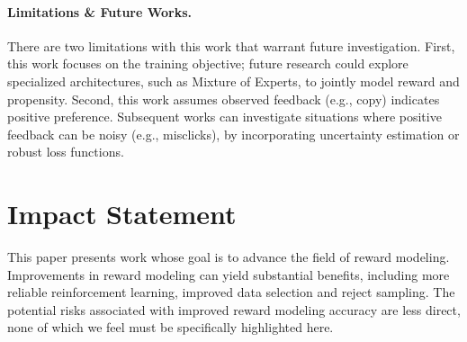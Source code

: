 \documentclass[]{arxiv_singlecolumn}
\theoremstyle{plain}
\newtheorem{theorem}{Theorem}[section]
\theoremstyle{definition}
\theoremstyle{remark}
\begin{document}
\paragraph{Limitations \& Future Works.} 
There are two limitations with this work that warrant future investigation. First, this work focuses on the training objective; future research could explore specialized architectures, such as Mixture of Experts, to jointly model reward and propensity. 
Second, this work assumes observed feedback (e.g., copy) indicates positive preference. Subsequent works can investigate situations where positive feedback can be noisy (e.g., misclicks), by incorporating uncertainty estimation or robust loss functions.

\section*{Impact Statement}
This paper presents work whose goal is to advance the field of reward modeling.  Improvements in reward modeling can yield substantial benefits, including more reliable reinforcement learning, improved data selection and reject sampling.
The potential risks associated with improved reward modeling accuracy are less direct, none of which we feel must be specifically highlighted here.

\small


\normalsize
\clearpage
\appendix
\onecolumn








\end{document}
